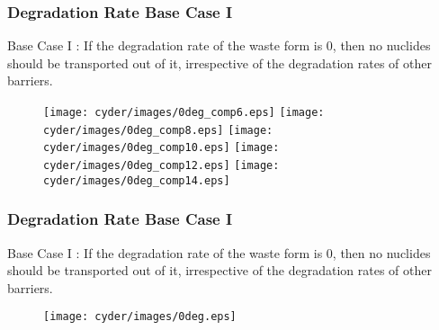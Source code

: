 \begin{frame}
  \frametitle{Degradation Rate Base Case I}
  Base Case I : If the degradation rate of the waste form is 0, then no nuclides should be 
  transported out of it, irrespective of the degradation rates of other 
  barriers. 

  \begin{figure}[htbp!]
    \begin{center}
      \texttt{[image: cyder/images/0deg\_comp6.eps]}
      \texttt{[image: cyder/images/0deg\_comp8.eps]}
      \texttt{[image: cyder/images/0deg\_comp10.eps]}
      \texttt{[image: cyder/images/0deg\_comp12.eps]}
      \texttt{[image: cyder/images/0deg\_comp14.eps]}
    \end{center}
  \end{figure}
\end{frame}

\begin{frame}
  \frametitle{Degradation Rate Base Case I}
  Base Case I : If the degradation rate of the waste form is 0, then no nuclides should be 
  transported out of it, irrespective of the degradation rates of other 
  barriers. 

  \begin{figure}[htbp!]
    \begin{center}
      \texttt{[image: cyder/images/0deg.eps]}
    \end{center}
  \end{figure}
\end{frame}

